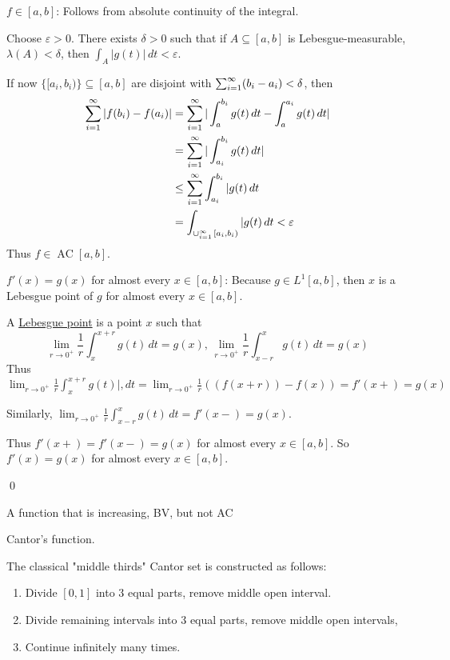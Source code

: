 \documentclass[x11names,reqno,14pt]{extarticle}
\newcommand{\seq}[2][\oo]{_{#2 = 1}^#1}
\newcommand{\cupi}[1][\oo]{\cup\seq[#1]{i}}
\DeclareMathOperator{\AC}{AC}
\begin{document}
$f \in [a, b]$: Follows from absolute continuity of the integral. 

Choose $\varepsilon>0$. There exists $\delta>0$ such that if $A \subseteq [a, b]$ is Lebesgue-measurable, $\lambda(A)<\delta$, then $\int_A|g(t)|\,dt < \varepsilon$. 

If now $\{[a_i, b_i)\} \subseteq [a, b]$ are disjoint with $\sum\seq{i}(b_i-a_i)<\delta$, then 
\begin{align*}
\sum\seq{i}|f(b_i) - f(a_i)| & = \sum\seq{i}|\int_a^{b_i}g(t)\,dt - \int_a^{a_i}g(t)\,dt| \\
& = \sum\seq{i}|\int_{a_i}^{b_i}g(t)\,dt| \\
& \leq \sum\seq{i}\int_{a_i}^{b_i}|g(t)\,dt \\
& = \int_{{\cupi\,[a_i,b_i)}}|g(t)\,dt < \varepsilon \\
\end{align*}
Thus $f \in \AC[a,b]$. 

$f'(x) = g(x)$ for almost every $x \in [a,b]$: Because $g\in L^1[a,b]$, then $x$ is a Lebesgue point of $g$ for almost every $x \in [a, b]$. 


A \underline{Lebesgue point} is a point $x$ such that 
\[
\lim_{r\to0^+}\frac{1}{r}\int_x^{x + r}g(t)\,dt = g(x), \,\lim_{r\to0^+}\frac{1}{r}\int_{x - r}^xg(t)\,dt = g(x)
\]
Thus $\lim_{r\to0^+}\frac{1}{r}\int_x^{x + r}g(t)|,dt = \lim_{r\to0^+}\frac{1}{r}((f(x + r)) - f(x)) = f'(x+) = g(x)$

Similarly, $\lim_{r\to0^+}\frac{1}{r}\int_{x-r}^xg(t)\,dt = f'(x-) = g(x)$. 

Thus $f'(x+) = f'(x-) = g(x)$ for almost every $x \in [a,b]$. So $f'(x) = g(x)$ for almost every $x \in [a, b]$. 

\qed

\exm A function that is increasing, BV, but not AC

Cantor's function.

The classical "middle thirds" Cantor set is constructed as follows: 
\begin{enumerate}

\item Divide $[0,1]$ into 3 equal parts, remove middle open interval. 

\item Divide remaining intervals into 3 equal parts, remove middle open intervals, 
\item Continue infinitely many times.

\end{enumerate}
\end{document}
